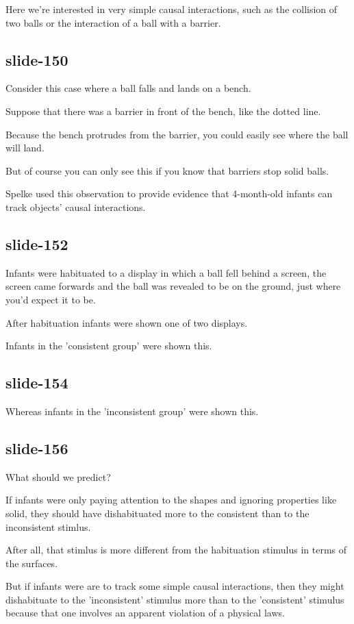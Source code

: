 \documentclass[12pt,\papersize]{extarticle}
\begin{document}
Here we're interested in very simple causal interactions, such as the collision of two balls or the interaction of a ball with a barrier.
 
\subsection{slide-150}
Consider this case where a ball falls and lands on a bench.
 
Suppose that there was a barrier in front of the bench, like the dotted line.
 
Because the bench protrudes from the barrier, you could easily see where the ball will land.
 
But of course you can only see this if you know that barriers stop solid balls.
 
Spelke used this observation to provide evidence that 4-month-old infants can track objects' causal interactions.
 
\subsection{slide-152}
Infants were habituated to a display in which a ball fell behind a screen, the screen came forwards and the ball was revealed to be on the ground, just where you'd expect it to be.
 
After habituation infants were shown one of two displays.
 
Infants in the 'consistent group' were shown this.
 
\subsection{slide-154}
Whereas infants in the 'inconsistent group' were shown this.
 
\subsection{slide-156}
What should we predict?
 
If infants were only paying attention to the shapes and ignoring properties like solid, they should have dishabituated more to the consistent than to the inconsistent stimlus.
 
After all, that stimlus is more different from the habituation stimulus in terms of the surfaces.
 
But if infants were are to track some simple causal interactions, then they might dishabituate to the 'inconsistent' stimulus more than to the 'consistent' stimulus because that one involves an apparent violation of a physical laws.
 
\end{document}
